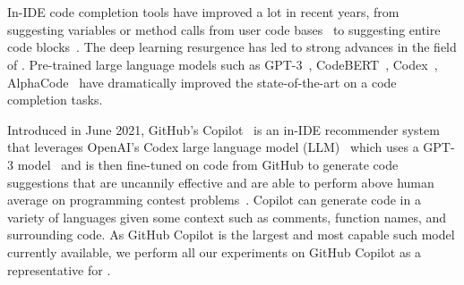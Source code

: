 \section{\cct{}}
In-IDE code completion tools have improved a lot in recent years, from suggesting variables or method calls from user code bases~\cite{mandelin2005} to suggesting entire code blocks~\cite{Ciniselli2021}. The deep learning resurgence has led to strong advances in the field of \cct{}. Pre-trained large language models such as GPT-3~\cite{Gpt3}, CodeBERT~\cite{codebert}, Codex~\cite{copilot}, AlphaCode~\cite{alphacode} have dramatically improved the state-of-the-art on a code completion tasks.

Introduced in June 2021, GitHub's Copilot~\cite{Copilot-web} is an in-IDE recommender system that leverages OpenAI's Codex large language model (LLM)~\cite{copilot} which uses a GPT-3 model~\cite{Gpt3} and is then fine-tuned on code from GitHub to generate code suggestions that are uncannily effective and are able to perform above human average on programming contest problems~\cite{empirical_eval}. Copilot can generate code in a variety of languages given some context such as comments, function names, and surrounding code. As GitHub Copilot is the largest and most capable such model currently available, we perform all our experiments on GitHub Copilot as a representative for \cct{}.